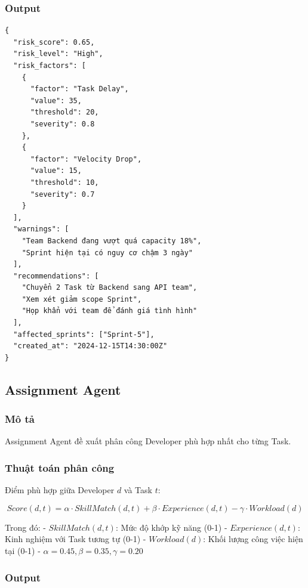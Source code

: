\documentclass[12pt,a4paper]{report}
\begin{document}
\subsubsection{Output}

\begin{verbatim}
{
  "risk_score": 0.65,
  "risk_level": "High",
  "risk_factors": [
    {
      "factor": "Task Delay",
      "value": 35,
      "threshold": 20,
      "severity": 0.8
    },
    {
      "factor": "Velocity Drop",
      "value": 15,
      "threshold": 10,
      "severity": 0.7
    }
  ],
  "warnings": [
    "Team Backend đang vượt quá capacity 18%",
    "Sprint hiện tại có nguy cơ chậm 3 ngày"
  ],
  "recommendations": [
    "Chuyển 2 Task từ Backend sang API team",
    "Xem xét giảm scope Sprint",
    "Họp khẩn với team để đánh giá tình hình"
  ],
  "affected_sprints": ["Sprint-5"],
  "created_at": "2024-12-15T14:30:00Z"
}
\end{verbatim}

\subsection{Assignment Agent}

\subsubsection{Mô tả}

Assignment Agent đề xuất phân công Developer phù hợp nhất cho từng Task.

\subsubsection{Thuật toán phân công}

Điểm phù hợp giữa Developer \(d\) và Task \(t\):

\[
Score(d,t) = \alpha \cdot SkillMatch(d,t) + \beta \cdot Experience(d,t) - \gamma \cdot Workload(d)
\]

Trong đó:
- \(SkillMatch(d,t)\): Mức độ khớp kỹ năng (0-1)
- \(Experience(d,t)\): Kinh nghiệm với Task tương tự (0-1)
- \(Workload(d)\): Khối lượng công việc hiện tại (0-1)
- \(\alpha = 0.45, \beta = 0.35, \gamma = 0.20\)

\subsubsection{Output}
\end{document}
